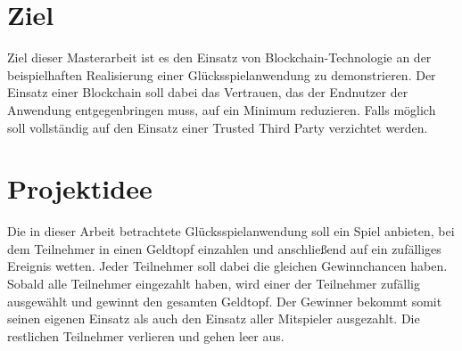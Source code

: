 \section{Ziel}
Ziel dieser Masterarbeit ist es den Einsatz von Blockchain-Technologie an der beispielhaften Realisierung einer Glücksspielanwendung zu demonstrieren. Der Einsatz einer Blockchain soll dabei das Vertrauen, das der Endnutzer der Anwendung entgegenbringen muss, auf ein Minimum reduzieren. Falls möglich soll vollständig auf den Einsatz einer Trusted Third Party verzichtet werden.




\section{Projektidee}
Die in dieser Arbeit betrachtete Glücksspielanwendung soll ein Spiel anbieten, bei dem Teilnehmer in einen Geldtopf einzahlen und anschließend auf ein zufälliges Ereignis wetten. Jeder Teilnehmer soll dabei die gleichen Gewinnchancen haben. Sobald alle Teilnehmer eingezahlt haben, wird einer der Teilnehmer zufällig ausgewählt und gewinnt den gesamten Geldtopf. Der Gewinner bekommt somit seinen eigenen Einsatz als auch den Einsatz aller Mitspieler ausgezahlt. Die restlichen Teilnehmer verlieren und gehen leer aus.\\\\

